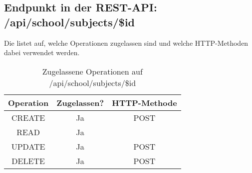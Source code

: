 \subsection{Endpunkt in der REST-API: /api/school/subjects/\$id}
Die  listet auf, welche Operationen zugelassen sind und welche HTTP-Methoden dabei verwendet werden. 

\begin{table}[!htbp]
	\begin{tabular}{|c|c|c|}
		\hline
			\textbf{Operation} & \textbf{Zugelassen?} & \textbf{HTTP-Methode} \\ \hline
			CREATE & Ja & POST \\ \hline 
			READ & Ja &  \\ \hline
			UPDATE & Ja & POST \\ \hline 
			DELETE & Ja & POST \\ \hline
	\end{tabular}

		\caption{Zugelassene Operationen auf /api/school/subjects/\$id}
		\label{tab:end:rest:api:school:subjects:id:meth}
\end{table}

